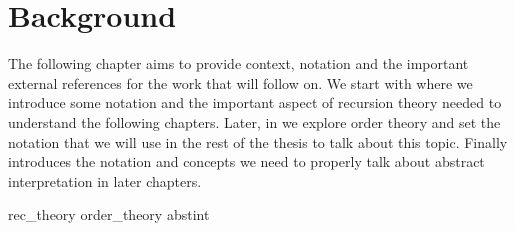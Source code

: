 \chapter{Background}\label{ch:background}
The following chapter aims to provide context, notation and the
important external references for the work that will follow on.  We
start with  where we introduce some
notation and the important aspect of recursion theory needed to
understand the following chapters.  Later, in
 we explore order theory and set the
notation that we will use in the rest of the thesis to talk about this
topic. Finally  introduces the notation and
concepts we need to properly talk about abstract interpretation in
later chapters.

{rec_theory}
{order_theory}
{abstint}
